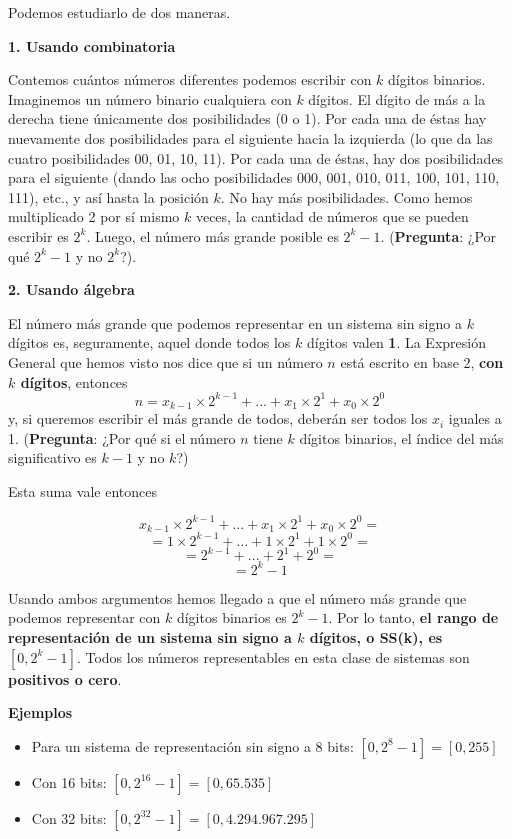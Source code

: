 \documentclass[spanish,A4,]{article}
\begin{document}
Podemos estudiarlo de dos maneras.

\textbf{1. Usando combinatoria}

Contemos cuántos números diferentes podemos escribir con $k$ dígitos
binarios. Imaginemos un número binario cualquiera con $k$ dígitos. El
dígito de más a la derecha tiene únicamente dos posibilidades (0 o 1).
Por cada una de éstas hay nuevamente dos posibilidades para el siguiente
hacia la izquierda (lo que da las cuatro posibilidades 00, 01, 10, 11).
Por cada una de éstas, hay dos posibilidades para el siguiente (dando
las ocho posibilidades 000, 001, 010, 011, 100, 101, 110, 111), etc., y
así hasta la posición $k$. No hay más posibilidades. Como hemos
multiplicado 2 por sí mismo $k$ veces, la cantidad de números que se
pueden escribir es $2^k$. Luego, el número más grande posible es
$2^k - 1$. (\textbf{Pregunta}: ¿Por qué $2^k - 1$ y no $2^k$?).

\textbf{2. Usando álgebra}

El número más grande que podemos representar en un sistema sin signo a
$k$ dígitos es, seguramente, aquel donde todos los $k$ dígitos valen
\textbf{1}. La Expresión General que hemos visto nos dice que si un
número $n$ está escrito en base 2, \textbf{con $k$ dígitos}, entonces
\[n = x_{k-1}\times 2^{k-1} + ... + x_1\times2^1+x_0\times2^0\] y, si
queremos escribir el más grande de todos, deberán ser todos los $x_i$
iguales a 1. (\textbf{Pregunta}: ¿Por qué si el número $n$ tiene $k$
dígitos binarios, el índice del más significativo es $k-1$ y no $k$?)

Esta suma vale entonces

\[ x_{k-1}\times 2^{k-1} + ... + x_1\times2^1+x_0\times2^0 = \]
\[  = 1\times 2^{k-1} + ... + 1\times2^1+1\times2^0 = \]
\[  = 2^{k-1} + ... + 2^1+2^0 = \] \[  = 2^{k}-1 \]

Usando ambos argumentos hemos llegado a que el número más grande que
podemos representar con $k$ dígitos binarios es $2^k-1$. Por lo tanto,
\textbf{el rango de representación de un sistema sin signo a $k$
dígitos, o SS(k), es $[0, 2^k - 1]$}. Todos los números representables
en esta clase de sistemas son \textbf{positivos o cero}.

\textbf{Ejemplos}

\begin{itemize}
\itemsep1pt\parskip0pt
\item
  Para un sistema de representación sin signo a 8 bits:
  $[0, 2^8-1] = [0, 255]$
\item
  Con 16 bits: $[0, 2^{16}-1] = [0, 65.535]$
\item
  Con 32 bits: $[0, 2^{32}-1] = [0, 4.294.967.295]$
\end{itemize}
\end{document}
